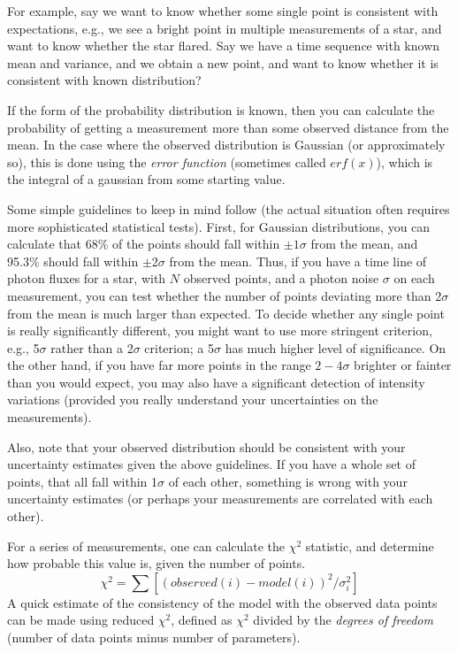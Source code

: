 \documentclass[12pt]{article}
\begin{document}
For example, say we want to know whether some single point
is consistent with expectations, e.g., we see a bright point in
multiple measurements of a star, and want to know whether the star
flared. Say we have a time sequence with known mean and variance, and
we obtain a new point, and want to know whether it is consistent with
known distribution?

If the form of the probability distribution is known, then
you can calculate the probability of getting a measurement more than
some observed distance from the mean. In the case where the observed
distribution is Gaussian (or approximately so), this is done using the
\emph{error function} (sometimes called $erf(x)$), which is the integral of a
gaussian from some starting value.

Some simple guidelines to keep in mind follow (the actual
situation often requires more sophisticated statistical tests). First,
for Gaussian distributions, you can calculate that 68\% of the points
should fall within $\pm 1\sigma$ from the mean, and 95.3\%
should fall within $\pm 2\sigma$ from the mean. Thus, if you have a
time line of photon fluxes for a star, with $N$ observed points, and a
photon noise $\sigma$ on each measurement, you can test whether the
number of points deviating more than 2$\sigma$ from the mean is much
larger than expected. To decide whether any single point is really
significantly different, you might want to use more stringent
criterion, e.g., 5$\sigma$ rather than a 2$\sigma$ criterion;
a 5$\sigma$ has much higher level of significance. On the other hand, if
you have far more points in the range $2-4\sigma$ brighter or
fainter than you would expect, you may also have a significant
detection of intensity variations (provided you really understand your
uncertainties on the measurements).

Also, note that your observed distribution should be
consistent with your uncertainty estimates given the above guidelines.
If you have a whole set of points, that all fall within 1$\sigma$ of
each other, something is wrong with your uncertainty estimates (or
perhaps your measurements are correlated with each other).

For a series of measurements, one can calculate the
$\chi^{2}$ statistic, and determine how probable this value is,
given the number of points.
    $$ \chi^2 = \sum [(observed(i)-model(i))^2/\sigma_i^2]  $$
A quick estimate of the consistency of the model with the observed
data points can be made using reduced $\chi^{2}$, defined as
$\chi^{2}$ divided by the \emph{degrees of freedom} (number of data points
minus number of parameters).
\end{document}
